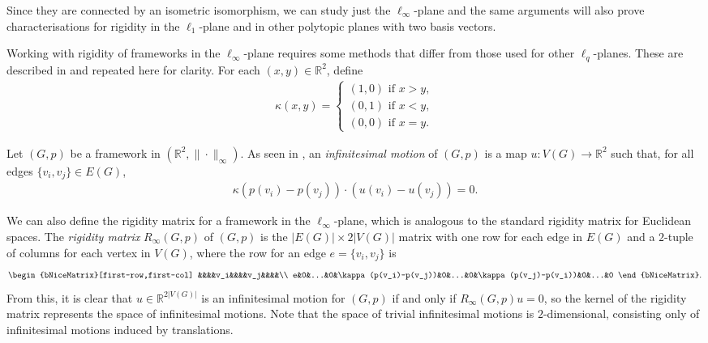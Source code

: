 \documentclass[reqno,a4paper,10pt]{article}
\theoremstyle{definition}
\theoremstyle{remark}
\numberwithin{equation}{section}
\numberwithin{figure}{section}
\numberwithin{table}{section}
\newcommand{\R}{\mathbb{R}}
\begin{document}
    Since they are connected by an isometric isomorphism, we can study just the $\ell_\infty$-plane and the same arguments will also prove characterisations for rigidity in the $\ell_1$-plane and in other polytopic planes with two basis vectors.

    Working with rigidity of frameworks in the $\ell_\infty$-plane requires some methods that differ from those used for other $\ell_q$-planes. These are described in \cite{NonEuclidean} and repeated here for clarity. For each $(x,y)\in\R^2$, define
    \begin{align*}
        \kappa(x,y)=
        \begin{cases}
            (1,0)\text{ if }x>y,\\
            (0,1)\text{ if }x<y,\\
            (0,0)\text{ if }x=y.
        \end{cases}
    \end{align*}

    Let $(G,p)$ be a framework in $(\R^2,\|\cdot\|_\infty)$. As seen in \cite[Proposition 4.2]{NonEuclidean}, an \emph{infinitesimal motion} of $(G,p)$ is a map $u:V(G)\to\R^2$ such that, for all edges $\{v_i,v_j\}\in E(G)$,
    \begin{align*}
        \kappa(p(v_i)-p(v_j))\cdot(u(v_i)-u(v_j))=0.
    \end{align*}

    We can also define the rigidity matrix for a framework in the $\ell_\infty$-plane, which is analogous to the standard rigidity matrix for Euclidean spaces. The \emph{rigidity matrix} $R_{\infty}(G,p)$ of $(G,p)$ is the $|E(G)|\times 2|V(G)|$ matrix with one row for each edge in $E(G)$ and a $2$-tuple of columns for each vertex in $V(G)$, where the row for an edge $e=\{v_i,v_j\}$ is
     \setcounter{MaxMatrixCols}{20}
		\begin{align*}
        \begin{bNiceMatrix}[first-row,first-col]
         &&&&v_i&&&&v_j&&&&\\
		  e&0&...&0&\kappa(p(v_i)-p(v_j))&0&...&0&\kappa(p(v_j)-p(v_i))&0&...&0
        \end{bNiceMatrix}
        .
    \end{align*}
    From this, it is clear that $u\in\R^{2|V(G)|}$ is an infinitesimal motion for $(G,p)$ if and only if $R_{\infty}(G,p)u=0$, so the kernel of the rigidity matrix represents the space of infinitesimal motions. Note that the space of trivial infinitesimal motions is $2$-dimensional, consisting only of infinitesimal motions induced by translations. 
\end{document}
